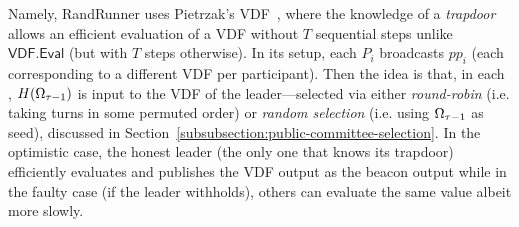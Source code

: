 Namely, RandRunner uses Pietrzak's VDF~\cite{pietrzak2018simple}, where the knowledge of a \textit{trapdoor} allows an efficient evaluation of a VDF without $T$ sequential steps unlike $\mathsf{VDF.Eval}$ (but with $T$ steps otherwise).
In its setup, each $P_i$ broadcasts $pp_i$ (each corresponding to a different VDF per participant).
Then the idea is that, in each \epoch, $H(\Omega_{\tau - 1})$ is input to the VDF of the \epoch leader---selected via either \textit{round-robin} (i.e. taking turns in some permuted order) or \textit{random selection} (i.e. using $\Omega_{\tau - 1}$ as seed), discussed in Section~\ref{subsubsection:public-committee-selection}.
In the optimistic case, the honest leader (the only one that knows its trapdoor) efficiently evaluates and publishes the VDF output as the beacon output while in the faulty case (if the leader withholds), others can evaluate the same value albeit more slowly.

